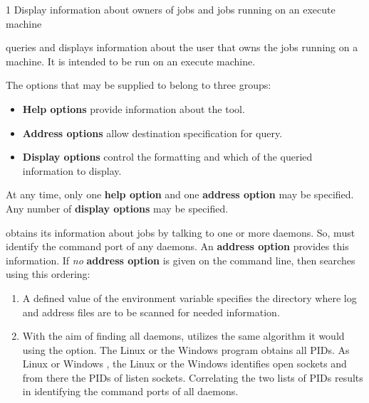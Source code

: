 \begin{ManPage}{\label{man-condor-who}}{1}
{Display information about owners of jobs and jobs running on an execute machine}
\Synopsis {}


\Description
{} queries and displays information about the user that
owns the jobs running on a machine.
It is intended to be run on an execute machine.

The options that may be supplied to  belong to three groups:
\begin{itemize}
  \item \textbf{Help options} provide information about the 
  tool.
  \item \textbf{Address options} allow destination specification for query.
  \item \textbf{Display options} control the formatting and which of the 
  queried information to display.
\end{itemize}

At any time, only one \textbf{help option} and one \textbf{address option}
may be specified.  
Any number of \textbf{display options} may be specified.

 obtains its information about jobs by talking to 
one or more  daemons.
So,  must identify the command port of any 
daemons.
An \textbf{address option} provides this information.
If \emph{no} \textbf{address option} is given on the command line,
then  searches using this ordering:
\begin{enumerate}
  \item A defined value of the environment variable 
  specifies the directory where log and address files are to be scanned
  for needed information.
  \item With the aim of finding all  daemons,
   utilizes the same algorithm it would using the
   option.
  The Linux  or the Windows 
  program obtains all PIDs.
  As Linux  or Windows ,
  the Linux  or the Windows  identifies open
  sockets and from there the PIDs of listen sockets.
  Correlating the two lists of PIDs results in identifying the command ports of
  all  daemons. 
\end{enumerate}



\end{ManPage}
